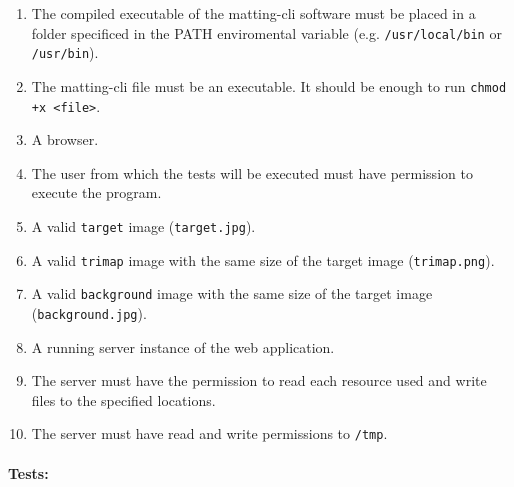 \documentclass[a4paper]{article}
\begin{document}
\begin{enumerate}
    \item The compiled executable of the matting-cli software
    must be placed in a folder specificed in the \textsc{PATH}
    enviromental variable (e.g. \texttt{/usr/local/bin} or \texttt{/usr/bin}).
    \item The matting-cli file must be an executable. It should be enough to run
    \lstinline{chmod +x <file>}.
    \item A browser.
    \item The user from which the tests will be executed must have permission to execute
    the program.
    \item A valid \texttt{target} image (\texttt{target.jpg}).
    \item A valid \texttt{trimap} image with the same size of the target image (\texttt{trimap.png}).
    \item A valid \texttt{background} image with the same size of the target image (\texttt{background.jpg}).
    \item A running server instance of the web application.
    \item The server must have the permission to read each resource used and write files
    to the specified locations.
    \item The server must have read and write permissions to \texttt{/tmp}.
\end{enumerate}

\paragraph{Tests:}


\end{document}
